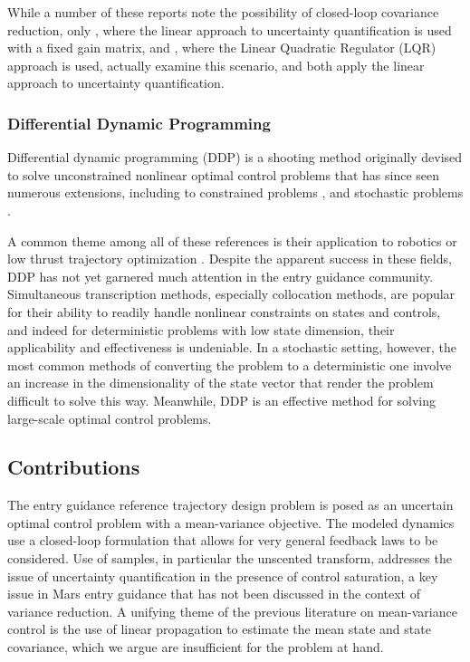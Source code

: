 \documentclass[journal ]{new-aiaa}
\begin{document}
While a number of these reports note the possibility of closed-loop covariance reduction, only \cite{MarsEntryDesensitized}, where the linear approach to uncertainty quantification is used with a fixed gain matrix, and \cite{EntryOUUThesis2}, where the Linear Quadratic Regulator (LQR) approach is used, actually examine this scenario, and both apply the linear approach to uncertainty quantification.

\subsubsection*{Differential Dynamic Programming}
Differential dynamic programming (DDP) \cite{DDP} is a shooting method originally devised to solve unconstrained nonlinear optimal control problems that has since seen numerous extensions, including to constrained problems \cite{DDP_ControlLimited,HDDP1,HDDP2,DDP_NonlinearConstraints,DDP_InteriorPoint}, and stochastic problems \cite{iLQG, DDP_Stochastic, ozaki_UT,ozaki2020tube}. 

A common theme among all of these references is their application to robotics \cite{iLQG, DDP_Stochastic} or low thrust trajectory optimization \cite{HDDP1,HDDP2,ozaki_UT,ozaki2020tube}. Despite the apparent success in these fields, DDP has not yet garnered much attention in the entry guidance community. Simultaneous transcription methods, especially collocation methods, are popular for their ability to readily handle nonlinear constraints on states and controls, and indeed for deterministic problems with low state dimension, their applicability and effectiveness is undeniable. In a stochastic setting, however, the most common methods of converting the problem to a deterministic one involve an increase in the dimensionality of the state vector that render the problem difficult to solve this way. Meanwhile, DDP is an effective method for solving large-scale optimal control problems. 

\subsection*{Contributions}
The entry guidance reference trajectory design problem is posed as an uncertain optimal control problem with a mean-variance objective. The modeled dynamics use a closed-loop formulation that allows for very general feedback laws to be considered. Use of samples, in particular the unscented transform, addresses the issue of uncertainty quantification in the presence of control saturation, a key issue in Mars entry guidance that has not been discussed in the context of variance reduction.
A unifying theme of the previous literature on mean-variance control is the use of linear propagation to estimate the mean state and state covariance, which we argue are insufficient for the problem at hand. 
\end{document}
